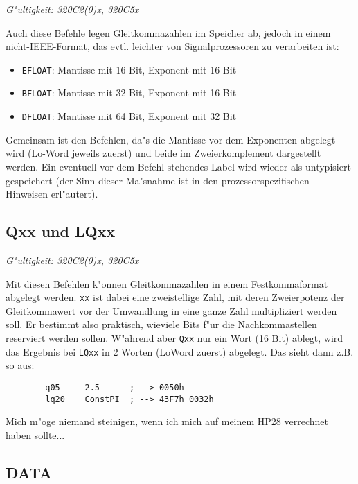 \documentclass[12pt,a4paper,twoside]{report}
\makeatletter
\newcommand{\tty}[1]{{\tt #1}}
\newcommand{\ttindex}[1]{\index{#1@{\tt #1}}}
\makeatother
\begin{document}
{\em G"ultigkeit: 320C2(0)x, 320C5x}

Auch diese Befehle legen Gleitkommazahlen im Speicher ab,
jedoch in einem nicht-IEEE-Format, das evtl. leichter von
Signalprozessoren zu verarbeiten ist:
\begin{itemize}
\item{\tty{EFLOAT}: Mantisse mit 16 Bit, Exponent mit 16 Bit}
\item{\tty{BFLOAT}: Mantisse mit 32 Bit, Exponent mit 16 Bit}
\item{\tty{DFLOAT}: Mantisse mit 64 Bit, Exponent mit 32 Bit}
\end{itemize}
Gemeinsam ist den Befehlen, da"s die Mantisse vor dem
Exponenten abgelegt wird (Lo-Word jeweils zuerst) und
beide im Zweierkomplement dargestellt werden.  Ein eventuell
vor dem Befehl stehendes Label wird wieder als untypisiert
gespeichert (der Sinn dieser Ma"snahme ist in den
prozessorspezifischen Hinweisen erl"autert).


\subsection{Qxx und LQxx}
\ttindex{Qxx}\ttindex{LQxx}

{\em G"ultigkeit: 320C2(0)x, 320C5x}

Mit diesen Befehlen k"onnen Gleitkommazahlen in einem Festkommaformat
abgelegt werden.  \tty{xx} ist dabei eine zweistellige Zahl, mit deren
Zweierpotenz der Gleitkommawert vor der Umwandlung in eine ganze Zahl
multipliziert werden soll.  Er bestimmt also praktisch, wieviele Bits
f"ur die Nachkommastellen reserviert werden sollen.  W"ahrend aber
\tty{Qxx} nur ein Wort (16 Bit) ablegt, wird das Ergebnis bei \tty{LQxx}
in 2 Worten (LoWord zuerst) abgelegt.  Das sieht dann z.B. so
aus:
\begin{verbatim}
        q05     2.5      ; --> 0050h
        lq20    ConstPI  ; --> 43F7h 0032h
\end{verbatim}
Mich m"oge niemand steinigen, wenn ich mich auf meinem HP28
verrechnet haben sollte...


\subsection{DATA}
\ttindex{DATA}
\end{document}
